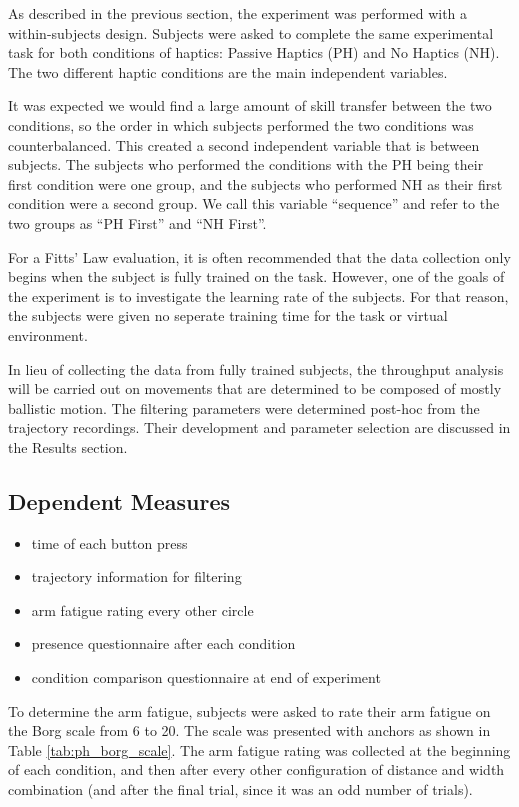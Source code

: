 As described in the previous section, the experiment was performed with a within-subjects design.
Subjects were asked to complete the same experimental task for both conditions of haptics: Passive Haptics (PH) and No Haptics (NH).
The two different haptic conditions are the main independent variables.

It was expected we would find a large amount of skill transfer between the two conditions, so the order in which subjects performed the two conditions was counterbalanced.
This created a second independent variable that is between subjects.
The subjects who performed the conditions with the PH being their first condition were one group, and the subjects who performed NH as their first condition were a second group.
We call this variable ``sequence'' and refer to the two groups as ``PH First'' and ``NH First''.

For a Fitts' Law evaluation, it is often recommended that the data collection only begins when the subject is fully trained on the task.
However, one of the goals of the experiment is to investigate the learning rate of the subjects.
For that reason, the subjects were given no seperate training time for the task or virtual environment.

In lieu of collecting the data from fully trained subjects, the throughput analysis will be carried out on movements that are determined to be composed of mostly ballistic motion.
The filtering parameters were determined post-hoc from the trajectory recordings.
Their development and parameter selection are discussed in the Results section.

\subsection{Dependent Measures}

\begin{itemize}
  \item time of each button press
  \item trajectory information for filtering
  \item arm fatigue rating every other circle
  \item presence questionnaire after each condition
  \item condition comparison questionnaire at end of experiment
\end{itemize}

To determine the arm fatigue, subjects were asked to rate their arm fatigue on the Borg scale from 6 to 20.
The scale was presented with anchors as shown in Table \ref{tab:ph_borg_scale}.
The arm fatigue rating was collected at the beginning of each condition, and then after every other configuration of distance and width combination (and after the final trial, since it was an odd number of trials).

